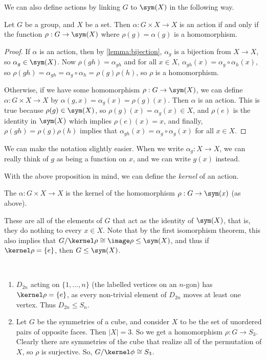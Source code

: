 \documentclass[a4]{scrreprt}
\begin{document}
We can also define actions by linking $G$ to $\sym(X)$ in the following way.

\begin{proposition}
	Let $G$ be a group, and $X$ be a set. Then $\alpha: G \times X \rightarrow X$ is an action if and only if the function $\rho: G \rightarrow \sym(X)$ where $\rho(g) = \alpha(g)$ is a homomorphism.
\end{proposition}
\begin{proof}
	If $\alpha$ is an action, then by \autoref{lemma:bijection}, $\alpha_g$ is a bijection from $X \rightarrow X$, so $\alpha_g \in \sym(X)$. Now $\rho(gh) = \alpha_{gh}$ and for all $x \in X$, $\alpha_{gh}(x) = \alpha_g \circ \alpha_h (x)$, so $\rho(gh) = \alpha_{gh} = \alpha_g \circ \alpha_h = \rho(g) \rho(h)$, so $\rho$ is a homomorphism.

	Otherwise, if we have some homomorphism $\rho : G \rightarrow \sym(X)$, we can define $\alpha: G \times X \rightarrow X$ by $\alpha(g, x) = \alpha_g(x)  = \rho(g)(x)$. Then $\alpha$ is an action. This is true because $\rho(g) \in \sym(X)$, so $\rho(g)(x) = \alpha_g(x) \in X$, and $\rho(e)$ is the identity in $\sym(X)$ which implies $\rho(e)(x) = x$, and finally, $\rho(gh) = \rho(g) \rho(h)$ implies that $\alpha_{gh}(x) = \alpha_g \circ \alpha_g (x)$ for all $x \in X$.   
\end{proof}

We can make the notation slightly easier. When we write $\alpha_g : X \rightarrow X$, we can really think of $g$ as being a function on $x$, and we can write $g(x)$ instead.

With the above proposition in mind, we can define the \emph{kernel} of an action.

\begin{definition}
	The  $\alpha : G \times X \rightarrow X$ is the kernel of the homomorphism $\rho : G \rightarrow \sym(x)$ (as above).
\end{definition}
These are all of the elements of $G$ that act as the identity of $\sym(X)$, that is, they do nothing to every $x \in X$. Note that by the first isomorphism theorem, this also implies that $G/\kernel \rho \cong \image \rho \leq \sym(X)$, and thus if $\kernel \rho = \{e\}$, then $G \leq \sym(X)$.

\begin{example}~
	    \vspace*{-1.5\baselineskip}
	\begin{enumerate}[label=(\roman*)]
		\item $D_{2n}$ acting on $\{1, \dots, n\}$ (the labelled vertices on an $n$-gon) has $\kernel \rho = \{ e\}$, as every non-trivial element of $D_{2n}$ moves at least one vertex. Thus $D_{2n} \leq S_n$.
		\item Let $G$ be the symmetries of a cube, and consider $X$ to be the set of unordered pairs of opposite faces. Then $|X| = 3$. So we get a homomorphism $\rho : G \rightarrow S_3$. Clearly there are symmetries of the cube that realize all of the permutation of $X$, so $\rho$ is surjective. So, $G/\kernel \phi \cong S_3$.
	\end{enumerate}
\end{example}
\end{document}
